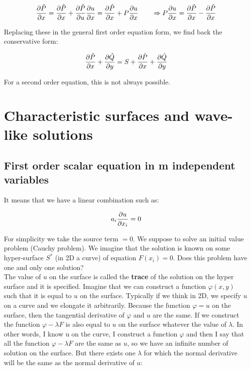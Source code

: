 \begin{equation}
\frac{\partial \tilde{P}}{\partial x} = \frac{\partial \hat{P}}{\partial x}  +\frac{\partial \hat{P}}{\partial u}\frac{\partial u}{\partial x}= \frac{\partial \hat{P}}{\partial x} + P\frac{\partial u}{\partial x} \qquad \Rightarrow P\frac{\partial u}{\partial x} = \frac{\partial \tilde{P}}{\partial x} - \frac{\partial \tilde{P}}{\partial x}
\end{equation}

Replacing these in the general first order equation form, we find back the conservative form: 

\begin{equation}
\frac{\partial \tilde{P}}{\partial x} + \frac{\partial \tilde{Q}}{\partial y} = S + \frac{\partial \hat{P}}{\partial x} + \frac{\partial \hat{Q}}{\partial y}
\end{equation}

For a second order equation, this is not always possible. 

\section{Characteristic surfaces and wave-like solutions}
\subsection{First order scalar equation in m independent variables}

It means that we have a linear combination such as: 

\begin{equation}
a_i \frac{\partial u}{\partial x_i} = 0 
\end{equation}

For simplicity we take the source term $=0$. We suppose to solve an initial value problem (Cauchy problem). We imagine that the solution is known on some hyper-surface $S^*$ (in 2D a curve) of equation $F(x_i) = 0$. Does this problem have one and only one solution? \\

The value of $u$ on the surface is called the \textbf{trace} of the solution on the hyper surface and it is specified. Imagine that we can construct a function $\varphi (x,y)$ such that it is equal to $u$ on the surface. Typically if we think in 2D, we specify $u$ on a curve and we elongate it arbitrarily. Because the function $\varphi = u$ on the surface, then the tangential derivative of $\varphi$ and $u$ are the same. If we construct the function $\varphi - \lambda F$ is also equal to $u$ on the surface whatever the value of $\lambda$. In other words, I know u on the curve, I construct a function $\varphi$ and then I say that all the function $\varphi - \lambda F$ are the same as $u$, so we have an infinite number of solution on the surface. But there exists one $\lambda$ for which the normal derivative will be the same as the normal derivative of $u$: 

